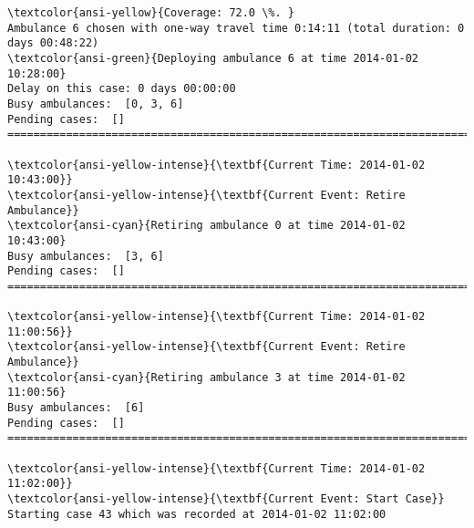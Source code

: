 \documentclass[11pt]{article}
\begin{document}
    \begin{Verbatim}[commandchars=\\\{\}]
\textcolor{ansi-yellow}{Coverage: 72.0 \%. }
Ambulance 6 chosen with one-way travel time 0:14:11 (total duration: 0 days 00:48:22)
\textcolor{ansi-green}{Deploying ambulance 6 at time 2014-01-02 10:28:00}
Delay on this case: 0 days 00:00:00
Busy ambulances:  [0, 3, 6]
Pending cases:  []
========================================================================

\textcolor{ansi-yellow-intense}{\textbf{Current Time: 2014-01-02 10:43:00}}
\textcolor{ansi-yellow-intense}{\textbf{Current Event: Retire Ambulance}}
\textcolor{ansi-cyan}{Retiring ambulance 0 at time 2014-01-02 10:43:00}
Busy ambulances:  [3, 6]
Pending cases:  []
========================================================================

\textcolor{ansi-yellow-intense}{\textbf{Current Time: 2014-01-02 11:00:56}}
\textcolor{ansi-yellow-intense}{\textbf{Current Event: Retire Ambulance}}
\textcolor{ansi-cyan}{Retiring ambulance 3 at time 2014-01-02 11:00:56}
Busy ambulances:  [6]
Pending cases:  []
========================================================================

\textcolor{ansi-yellow-intense}{\textbf{Current Time: 2014-01-02 11:02:00}}
\textcolor{ansi-yellow-intense}{\textbf{Current Event: Start Case}}
Starting case 43 which was recorded at 2014-01-02 11:02:00

    \end{Verbatim}

    \begin{center}
    \end{center}
    { \hspace*{\fill} \\}
    
\end{document}
